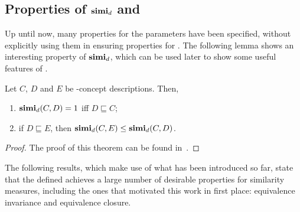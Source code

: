   \subsection{Properties of \(\mathbf{simi}_d\) and \simi}

  Up until now, many properties for the parameters have been specified, without explicitly using them in ensuring properties for \simi.
  The following lemma shows an interesting property of \(\mathbf{simi}_d\), which can be used later to show some useful features of \simi.

  \begin{lemma}
    \label{lem:simid}
    Let \(C\), \(D\) and \(E\) be \elh-concept descriptions.
    Then,
    \begin{enumerate}
      \item \(\mathbf{simi}_d(C,D) = 1\) iff \(D \sqsubseteq C\);
      \item if \(D \sqsubseteq E\), then \(\mathbf{simi}_d(C,E) \le \mathbf{simi}_d(C,D)\).
    \end{enumerate}
  \end{lemma}
  \begin{proof}
    The proof of this theorem can be found in~\cite{LeTu12}.
  \end{proof}

  The following results, which make use of what has been introduced so far, state that the defined \csm achieves a large number of desirable properties for similarity measures, including the ones that motivated this work in first place: equivalence invariance and equivalence closure.

